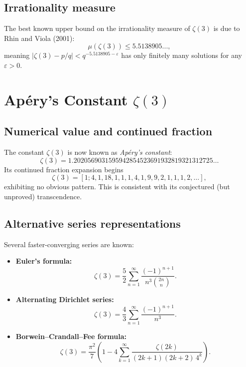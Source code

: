 \documentclass[12pt,a4paper]{amsart}
\theoremstyle{definition}
\theoremstyle{remark}
\begin{document}
\subsection{Irrationality measure}

The best known upper bound on the irrationality measure of $\zeta(3)$ is due to
Rhin and Viola (2001):
\[
  \mu(\zeta(3)) \leq 5.5138905...,
\]
meaning $|\zeta(3) - p/q| < q^{-5.5138905-\varepsilon}$ has only finitely many
solutions for any $\varepsilon > 0$.

\section{Apéry's Constant $\zeta(3)$}

\subsection{Numerical value and continued fraction}

The constant $\zeta(3)$ is now known as \emph{Apéry's constant}:
\[
  \zeta(3) = 1.2020569031595942854523691932819321312725\ldots
\]
Its continued fraction expansion begins
\[
  \zeta(3) = [1; 4, 1, 18, 1, 1, 1, 4, 1, 9, 9, 2, 1, 1, 1, 2, \ldots],
\]
exhibiting no obvious pattern. This is consistent with its conjectured (but
unproved) transcendence.

\subsection{Alternative series representations}

Several faster-converging series are known:

\begin{itemize}[leftmargin=2em]
  \item \textbf{Euler's formula:}
    \[
      \zeta(3) = \frac{5}{2} \sum_{n=1}^{\infty} \frac{(-1)^{n+1}}{n^3 \binom{2n}{n}}.
    \]
  \item \textbf{Alternating Dirichlet series:}
    \[
      \zeta(3) = \frac{4}{3} \sum_{n=1}^{\infty} \frac{(-1)^{n+1}}{n^3}.
    \]
  \item \textbf{Borwein--Crandall--Fee formula:}
    \[
      \zeta(3) = \frac{\pi^2}{7} \left( 1 - 4 \sum_{k=1}^{\infty}
      \frac{\zeta(2k)}{(2k+1)(2k+2)\, 4^k} \right).
    \]
\end{itemize}
\end{document}
